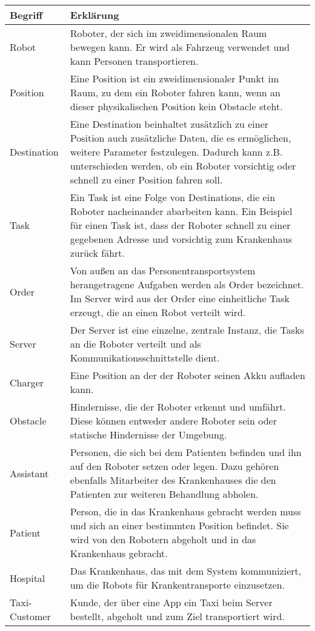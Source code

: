 	\begin{tabularx}{\textwidth}{|l|X|}
		\hline
		\textbf{Begriff} & \textbf{Erklärung}\\ \hline
		Robot & Roboter, der sich im zweidimensionalen Raum bewegen kann. Er wird als Fahrzeug verwendet und kann Personen transportieren.\\ \hline
		Position & Eine Position ist ein zweidimensionaler Punkt im Raum, zu dem ein Roboter fahren kann, wenn an dieser physikalischen Position kein Obstacle steht.\\ \hline
		Destination & Eine Destination beinhaltet zusätzlich zu einer Position auch zusätzliche Daten, die es ermöglichen, weitere Parameter festzulegen. 
		Dadurch kann z.B. unterschieden werden, ob ein Roboter vorsichtig oder schnell zu einer Position fahren soll. \\ \hline
		Task & Ein Task ist eine Folge von Destinations, die ein Roboter nacheinander abarbeiten kann. Ein Beispiel für einen Task ist, dass der Roboter schnell zu einer gegebenen Adresse und vorsichtig zum Krankenhaus zurück fährt.\\ \hline
		Order & Von außen an das Personentransportsystem herangetragene Aufgaben werden als Order bezeichnet. Im Server wird aus der Order eine einheitliche Task erzeugt, die an einen Robot verteilt wird.\\ \hline
		Server & Der Server ist eine einzelne, zentrale Instanz, die Tasks an die Roboter verteilt und als Kommunikationsschnittstelle dient.\\ \hline
		Charger & Eine Position an der der Roboter seinen Akku aufladen kann.\\ \hline
		Obstacle & Hindernisse, die der Roboter erkennt und umfährt. Diese können
		entweder andere Roboter sein oder statische Hindernisse der
		Umgebung.\\ \hline
		Assistant & Personen, die sich bei dem Patienten befinden und ihn auf den Roboter setzen oder legen.
		 Dazu gehören ebenfalls Mitarbeiter des Krankenhauses die den Patienten zur weiteren Behandlung abholen.\\ \hline
		Patient & Person, die in das Krankenhaus gebracht werden muss und sich an einer bestimmten Position befindet. 
		Sie wird von den Robotern abgeholt und in das Krankenhaus gebracht.\\ \hline
		Hospital & Das Krankenhaus, das mit dem System kommuniziert, um die Robots für Krankentransporte einzusetzen. \\ \hline
		Taxi-Customer & Kunde, der über eine App ein Taxi beim Server bestellt, abgeholt und zum Ziel transportiert wird.\\ \hline

\end{tabularx}
